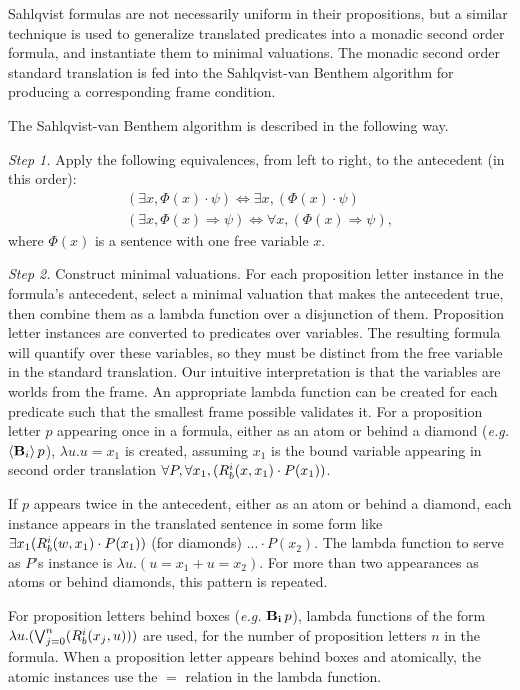 Sahlqvist formulas are not necessarily uniform in their propositions, but a similar technique is used to generalize translated predicates into a monadic second order formula, and instantiate them to minimal valuations. The monadic second order standard translation is fed into the Sahlqvist-van Benthem algorithm for producing a corresponding frame condition.

The Sahlqvist-van Benthem algorithm is described in the following way.

\emph{Step 1.} Apply the following equivalences, from left to right, to the antecedent (in this order):
\begin{eqnarray}
(\exists x, \varPhi(x) \cdot\psi )\Longleftrightarrow \exists x, (\varPhi(x) \cdot\psi)\\
(\exists x, \varPhi(x) \Longrightarrow \psi) \Longleftrightarrow \forall x, (\varPhi(x) \Longrightarrow \psi),
\end{eqnarray}
where $\varPhi(x)$ is a sentence with one free variable $x$.

\emph{Step 2.} Construct minimal valuations. For each proposition letter instance in the formula's antecedent, select a minimal valuation that makes the antecedent true, then combine them as a lambda function over a disjunction of them. Proposition letter instances are converted to predicates over variables. The resulting formula will quantify over these variables, so they must be distinct from the free variable in the standard translation. Our intuitive interpretation is that the variables are worlds from the frame. An appropriate lambda function can be created for each predicate such that the smallest frame possible validates it. For a proposition letter $p$ appearing once in a formula, either as an atom or behind a diamond (\emph{e.g. $\langle \mathbf{B}_{i} \rangle\,p$}), $\lambda u.u=x_1$ is created, assuming $x_1$ is the bound variable appearing in second order translation $\forall P,\forall x_1,(R_{b}^i(x,x_1)\cdot P(x_1))$. 

If $p$ appears twice in the antecedent, either as an atom or behind a diamond, each instance appears in the translated sentence in some form like $\exists x_1(R_{b}^i(w,x_1) \cdot P(x_1))$ (for diamonds) $... \cdot P(x_2)$. The lambda function to serve as $P$'s instance is $\lambda u.(u=x_1 + u=x_2)$. For more than two appearances as atoms or behind diamonds, this pattern is repeated.

For proposition letters behind boxes (\emph{e.g.} $\mathbf{B}_{\mathbf{i}}\,p$), lambda functions of the form $\lambda u.(\bigvee_{j=0}^n (R_{b}^i(x_j,u)))$ are used, for the number of proposition letters $n$ in the formula. When a proposition letter appears behind boxes and atomically, the atomic instances use the $=$ relation in the lambda function.

